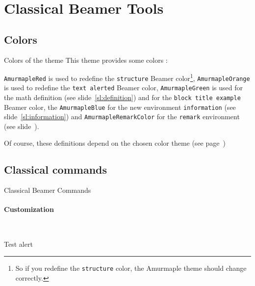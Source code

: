 \documentclass[10pt,aspectratio=169,english]{beamer}
\begin{document}
\section{Classical Beamer Tools}
\sepframe
\subsection{Colors}

\begin{frame}{Colors of the theme}
  This theme provides some colors :
  \begin{Code}
\end{Code}

\textcolor{AmurmapleRed}{\lstinline+AmurmapleRed+} is used to redefine the \lstinline+structure+
Beamer color\footnote{So if you redefine the \lstinline+structure+ color, the Amurmaple
theme should change correctly.}, \textcolor{AmurmapleOrange}{\lstinline+AmurmapleOrange+} is used to redefine
the \lstinline+text alerted+ Beamer color, \textcolor{AmurmapleGreen}{\lstinline+AmurmapleGreen+} is
used for the math definition (see slide~\ref{sl:definition}) and for the
\lstinline+block title example+ Beamer color, the
\textcolor{AmurmapleBlue}{\lstinline+AmurmapleBlue+} for the new environment
\lstinline+information+ (see slide~\ref{sl:information}) and \textcolor{AmurmapleRemarkColor}{\lstinline+AmurmapleRemarkColor+} for the \lstinline+remark+ environment (see slide~\pageref{sl:remark}).

Of course, these definitions depend on the chosen color theme (see page~\pageref{sec:coloroptions}) 
\end{frame}

\subsection{Classical commands}

\begin{frame}[fragile]{Classical Beamer Commands}
  \framesubtitle{Customization}
  \begin{Exemple}
~~
\end{Exemple}
\begin{Exemple}
 \alert{Test alert}
\end{Exemple}
\end{frame}
\end{document}

